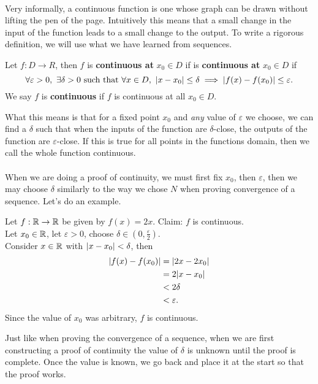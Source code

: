 \documentclass[../real_analysis.tex]{subfiles}
\begin{document}
        \paragraph{}
        Very informally, a continuous function is one whose graph can be drawn without lifting the pen of the page. Intuitively this means that a small change in the input of the function leads to a small change to the output. To write a rigorous definition, we will use what we have learned from sequences.
        \begin{definition}
            Let $f: D \to R$, then $f$ is \textbf{continuous at} $x_0\in D$ if is \textbf{continuous at} $x_0\in D$ if
            \begin{equation*}
                \forall\varepsilon>0,\ \exists\delta>0\text{ such that }\forall x\in D,\ \abs{x-x_0}\leq\delta\implies\abs{f(x)-f(x_0)}\leq\varepsilon.
            \end{equation*}
            We say $f$ is \textbf{continuous} if $f$ is continuous at all $x_0\in D$.
        \end{definition}
        What this means is that for a fixed point $x_0$ and \textit{any} value of $\varepsilon$ we choose, we can find a $\delta$ such that when the inputs of the function are $\delta$-close, the outputs of the function are $\varepsilon$-close. If this is true for all points in the functions domain, then we call the whole function continuous.
        \paragraph{}
        When we are doing a proof of continuity, we must first fix $x_0$, then $\varepsilon$, then we may choose $\delta$ similarly to the way we chose $N$ when proving convergence of a sequence. Let's do an example.
        \begin{example}
            Let $f: \mathbb{R}\to\mathbb{R}$ be given by $f(x)=2x$.
            Claim: $f$ is continuous.\\
            Let $x_0\in\mathbb{R}$, let $\varepsilon>0$, choose $\delta\in(0,\frac{\varepsilon}{2})$.\\
            Consider $x\in\mathbb{R}$ with $\lvert x-x_0\rvert<\delta$, then
            \begin{align*}
                \lvert f(x)-f(x_0)\rvert &= \lvert2x-2x_0\rvert\\
                &=2\lvert x-x_0\rvert\\
                &<2\delta\\
                &<\varepsilon.
            \end{align*}
            Since the value of $x_0$ was arbitrary, $f$ is continuous.
        \end{example}
        Just like when proving the convergence of a sequence, when we are first constructing a proof of continuity the value of $\delta$ is unknown until the proof is complete. Once the value is known, we go back and place it at the start so that the proof works.
\end{document}
